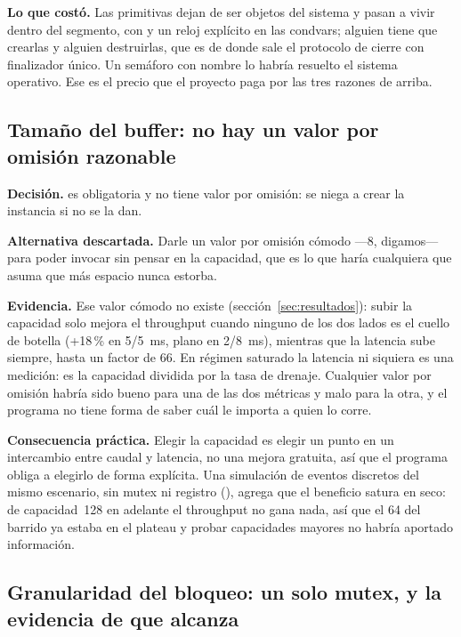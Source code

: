 \textbf{Lo que costó.} Las primitivas dejan de ser objetos del sistema y
pasan a vivir dentro del segmento, con  y un
reloj explícito en las condvars; alguien tiene que crearlas y alguien
destruirlas, que es de donde sale el protocolo de cierre con finalizador
único. Un semáforo con nombre lo habría resuelto el sistema operativo. Ese
es el precio que el proyecto paga por las tres razones de arriba.

\subsection{Tamaño del buffer: no hay un valor por omisión razonable}

\textbf{Decisión.}  es obligatoria y no tiene valor por
omisión:  se niega a crear la instancia si no se la dan.

\textbf{Alternativa descartada.} Darle un valor por omisión cómodo ---8,
digamos--- para poder invocar  sin pensar en la capacidad, que
es lo que haría cualquiera que asuma que más espacio nunca estorba.

\textbf{Evidencia.} Ese valor cómodo no existe
(sección~\ref{sec:resultados}): subir la capacidad solo mejora el throughput
cuando ninguno de los dos lados es el cuello de botella (+18\,\% en 5/5~ms,
plano en 2/8~ms), mientras que la latencia sube siempre, hasta un factor de
66. En régimen saturado la latencia ni siquiera es una medición: es la
capacidad dividida por la tasa de drenaje. Cualquier valor por omisión
habría sido bueno para una de las dos métricas y malo para la otra, y el
programa no tiene forma de saber cuál le importa a quien lo corre.

\textbf{Consecuencia práctica.} Elegir la capacidad es elegir un punto en un
intercambio entre caudal y latencia, no una mejora gratuita, así que el
programa obliga a elegirlo de forma explícita. Una simulación de eventos
discretos del mismo escenario, sin mutex ni registro
(), agrega que el beneficio satura en seco: de
capacidad~128 en adelante el throughput no gana nada, así que el 64 del
barrido ya estaba en el plateau y probar capacidades mayores no habría
aportado información.

\subsection{Granularidad del bloqueo: un solo mutex, y la evidencia de que alcanza}

